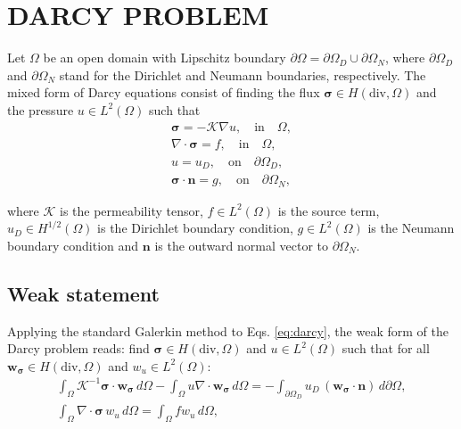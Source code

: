 \documentclass{wccm2024}
\begin{document}
\section{DARCY PROBLEM}

Let $\Omega$ be an open domain with Lipschitz boundary $\partial \Omega = \partial\Omega_D \cup \partial\Omega_N$, where $\partial\Omega_D$ and $\partial\Omega_N$ stand for the Dirichlet and Neumann boundaries, respectively. The mixed form of Darcy equations consist of finding the flux $\boldsymbol{\sigma} \in H(\text{div},\Omega)$ and the pressure $u \in L^2(\Omega)$ such that
\vskip -0.3cm
\begin{equation} \label{eq:darcy}
    \begin{split}
        \boldsymbol{\sigma}= -\mathcal{K}\nabla u, \quad \text{in} \quad \Omega, \\
        \nabla \cdot \boldsymbol{\sigma} = f, \quad \text{in} \quad \Omega, \\
        u = u_D, \quad \text{on} \quad \partial\Omega_D, \\
        \boldsymbol{\sigma} \cdot \boldsymbol{n} = g, \quad \text{on} \quad \partial\Omega_N,
    \end{split}
\end{equation}

\noindent where $\mathcal{K}$ is the permeability tensor, $f \in L^2(\Omega)$ is the source term, $u_D \in H^{1/2}(\Omega)$ is the Dirichlet boundary condition, $g \in L^2(\Omega)$ is the Neumann boundary condition and $\mathbf{n}$ is the outward normal vector to $\partial\Omega_N$.

\subsection{Weak statement}

Applying the standard Galerkin method to Eqs. \eqref{eq:darcy}, the weak form of the Darcy problem reads: find $\boldsymbol{\sigma} \in H(\text{div},\Omega)$ and $u \in L^2(\Omega)$ such that for all $\mathbf{w}_{\boldsymbol{\sigma}} \in H(\text{div},\Omega)$ and $w_u \in L^2(\Omega)$:
\vskip -0.3cm
\begin{equation} \label{eq:weak}
    \begin{split}
        \int_{\Omega} \mathcal{K}^{-1}\boldsymbol{\sigma} \cdot \mathbf{w}_{\boldsymbol{\sigma}} \, d\Omega - \int_{\Omega} u \nabla \cdot \mathbf{w}_{\boldsymbol{\sigma}} \, d\Omega = - \int_{\partial\Omega_D} u_D \, ( \mathbf{w}_{\boldsymbol{\sigma}} \cdot \mathbf{n}) \, d\partial\Omega, \\
        \int_{\Omega} \nabla \cdot \boldsymbol{\sigma} \,w_u \, d\Omega = \int_{\Omega} f w_u \, d\Omega,
    \end{split}
\end{equation}
\end{document}
